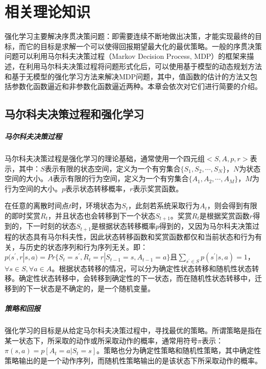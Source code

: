 \chapter{相关理论知识}
强化学习主要解决序贯决策问题：即需要连续不断地做出决策，才能实现最终的目标，而它的目标是求解一个可以使得回报期望最大化的最优策略。一般的序贯决策问题可以利用马尔科夫决策过程（Markov Decision Process, MDP）的框架来描述，在利用马尔科夫决策过程将问题形式化后，可以使用基于模型的动态规划方法和基于无模型的强化学习方法来解决MDP问题，其中，值函数的估计的方法又包括参数化函数逼近和非参数化函数逼近两种。本章会依次对它们进行简要的介绍。

\section{马尔科夫决策过程和强化学习}
\paragraph{马尔科夫决策过程}
马尔科夫决策过程是强化学习的理论基础，通常使用一个四元组$<S,A,p,r>$表示，其中：$S$表示有限的状态空间，定义为一个有穷集合$\{ S_1,S_2,\cdots ,S_N \}$，$N$为状态空间的大小。$A$表示有限的行为空间，定义为一个有穷集合$\{ A_1,A_2,\cdots ,A_M \}$，$M$为行为空间的大小。$p$表示状态转移概率，$r$表示奖赏函数。

在任意的离散时间点$t$时，环境状态为$S_{t}$，此刻若系统采取行为$A_t$，则会得到有限的即时奖赏$R_{t}$，并且状态也会转移到下一个状态$S_{t+1}$。奖赏$R_{t}$是根据奖赏函数$r$得到的，下一时刻的状态$S_{t+1}$是根据状态转移概率$p$得到的，又因为马尔科夫决策过程的状态具有马尔科夫性，因此状态转移函数和奖赏函数都仅和当前状态和行为有关，与历史的状态序列和行为序列无关。即：$p(s^{'},r|s,a) = Pr\{S_{t}=s^{'}, R_t=r|S_{t-1}=s, A_{t-1}=a\}$且$\sum_{s^{'}\in S}p(s^{'}|s,a)=1$，$\forall s\in S,\forall a\in A$。根据状态转移的情况，可以分为确定性状态转移和随机性状态转移。确定性状态转移中，会转移到确定性的下一状态，而在随机性状态转移中，迁移到的下一状态是不确定的，是一个随机变量。

\paragraph{策略和回报}
强化学习的目标是从给定马尔科夫决策过程中，寻找最优的策略。所谓策略是指在某一状态下，所采取的动作或所采取动作的概率，通常用符号$\pi$表示：$\pi(s,a)=p[A_{t}=a|S_{t}=s]$。策略也分为确定性策略和随机性策略，其中确定性策略输出的是一个动作序列，而随机性策略输出的是该状态下所采取动作的概率。

